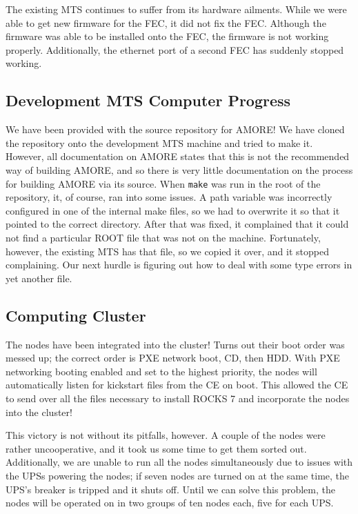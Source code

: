 \documentclass[12pt]{article}
\newcommand\tab[1][1cm]{\hspace*{#1}}
\begin{document}
\tab The existing MTS continues to suffer from its hardware ailments. While we
were able to get new firmware for the FEC, it did not fix the FEC. Although the
firmware was able to be installed onto the FEC, the firmware is not working
properly. Additionally, the ethernet port of a second FEC has suddenly stopped
working.

\subsection{Development MTS Computer Progress}

\tab We have been provided with the source repository for AMORE! We have cloned
the repository onto the development MTS machine and tried to make it. However,
all documentation on AMORE states that this is not the recommended way of
building AMORE, and so there is very little documentation on the process for
building AMORE via its source. When {\tt make} was run in the root of the
repository, it, of course, ran into some issues. A path variable was incorrectly
configured in one of the internal make files, so we had to overwrite it so that
it pointed to the correct directory. After that was fixed, it complained that it
could not find a particular ROOT file that was not on the machine. Fortunately,
however, the existing MTS has that file, so we copied it over, and it stopped
complaining. Our next hurdle is figuring out how to deal with some type errors
in yet another file.

\subsection{Computing Cluster}

\tab The nodes have been integrated into the cluster! Turns out their boot order
was messed up; the correct order is PXE network boot, CD, then HDD. With PXE
networking booting enabled and set to the highest priority, the nodes will
automatically listen for kickstart files from the CE on boot. This allowed the
CE to send over all the files necessary to install ROCKS 7 and incorporate the
nodes into the cluster! 

\tab This victory is not without its pitfalls, however. A couple of the nodes
were rather uncooperative, and it took us some time to get them sorted
out. Additionally, we are unable to run all the nodes simultaneously due to
issues with the UPSs powering the nodes; if seven nodes are turned on at the
same time, the UPS's breaker is tripped and it shuts off. Until we can solve
this problem, the nodes will be operated on in two groups of ten nodes each,
five for each UPS.
\end{document}
